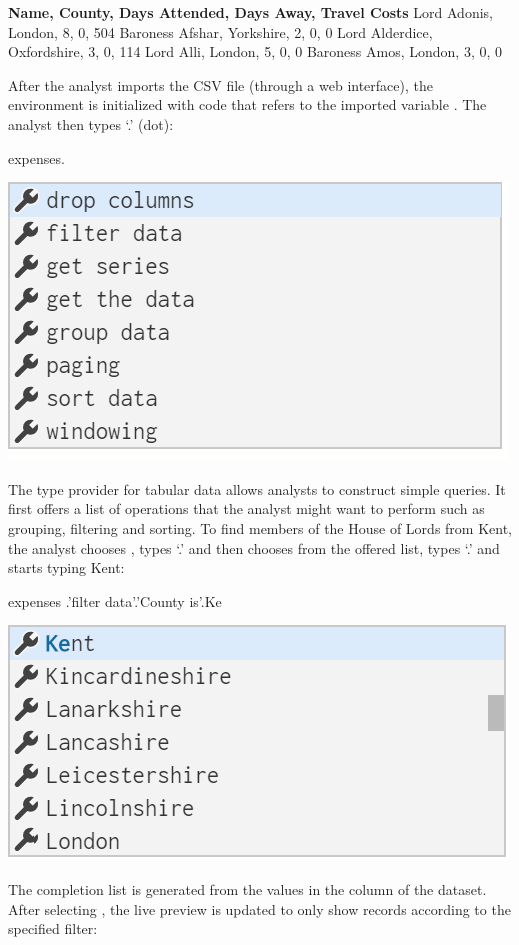 \documentclass[manuscript,review,anonymous]{acmart}
\begin{document}
\begin{thegamma}
\textbf{Name, County, Days Attended, Days Away, Travel Costs}
Lord Adonis, London, 8, 0, 504
Baroness Afshar, Yorkshire, 2, 0, 0
Lord Alderdice, Oxfordshire, 3, 0, 114
Lord Alli, London, 5, 0, 0
Baroness Amos, London, 3, 0, 0
\end{thegamma}

After the analyst imports the CSV file (through a web interface), the environment is initialized
with code that refers to the imported variable . The analyst then types `.' (dot):

\begin{thegamma}
expenses.
\end{thegamma}
\vspace{-0.4em}\qquad\includegraphics[width=0.5\columnwidth]{figures/lords1}

The type provider for tabular data allows analysts to construct simple queries. It first offers
a list of operations that the analyst might want to perform such as grouping, filtering and sorting.
To find members of the House of Lords from Kent, the analyst chooses ,
types `.' and then chooses  from the offered list, types `.' and starts
typing Kent:

\begin{thegamma}
expenses
  .'filter data'.'County is'.Ke
\end{thegamma}
\vspace{-0.4em}\qquad\includegraphics[width=0.5\columnwidth]{figures/lords2}

The completion list is generated from the values in the  column of the dataset.
After selecting , the live preview is updated to only show records according to the
specified filter:
\end{document}
